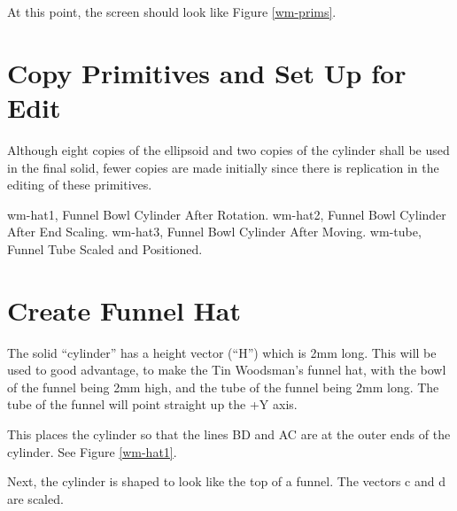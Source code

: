 At this point, the screen should look like Figure \ref{wm-prims}.

\section{Copy Primitives and Set Up for Edit}

Although eight copies of the ellipsoid and two copies of the cylinder
shall be used in the final solid, fewer copies are made initially since there
is replication in the editing of these primitives.


\mfig wm-hat1, Funnel Bowl Cylinder After Rotation.
\mfig wm-hat2, Funnel Bowl Cylinder After End Scaling.
\mfig wm-hat3, Funnel Bowl Cylinder After Moving.
\mfig wm-tube, Funnel Tube Scaled and Positioned.
\section{Create Funnel Hat}

The solid ``cylinder'' has a height vector (``H'') which is 2mm
long.
This will be used to good advantage, to make the Tin Woodsman's
funnel hat, with the bowl of the funnel being 2mm high,
and the tube of the funnel being 2mm long.
The tube of the funnel will point straight up the +Y axis.


This places the cylinder so that the lines BD and AC are at the outer
ends of the cylinder.  See Figure \ref{wm-hat1}.

Next, the cylinder is shaped to look like the top of a funnel.
The vectors c and d are scaled.

